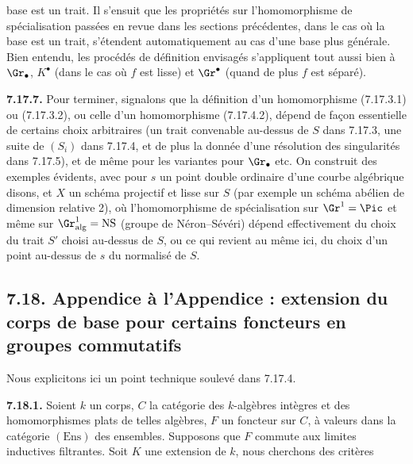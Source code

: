 base est un trait. Il s'ensuit que les propriétés sur l'homomorphisme de spécialisation passées en revue dans les sections précédentes, dans le cas où la base est un trait, s'étendent automatiquement au cas d'une base plus générale. Bien entendu, les procédés de définition envisagés s'appliquent tout aussi bien à \(\Gr_\bullet\), \(K^\bullet\) (dans le cas où \(f\) est lisse) et \(\Gr^\bullet\) (quand de plus \(f\) est séparé).

\textbf{7.17.7.} Pour terminer, signalons que la définition d'un homomorphisme (7.17.3.1) ou (7.17.3.2), ou celle d'un homomorphisme (7.17.4.2), dépend de façon essentielle de certains choix arbitraires (un trait convenable au-dessus de \(S\) dans 7.17.3, une suite de \((S_i)\) dans 7.17.4, et de plus la donnée d'une résolution des singularités dans 7.17.5), et de même pour les variantes pour \(\Gr_\bullet\) etc. On construit des exemples évidents, avec pour \(s\) un point double ordinaire d'une courbe algébrique disons, et \(X\) un schéma projectif et lisse sur \(S\) (par exemple un schéma abélien de dimension relative 2), où l'homomorphisme de spécialisation sur \(\Gr^1=\Pic\) et même sur \(\Gr^1_{\mathrm{alg}}=\mathrm{NS}\) (groupe de Néron--Sévéri) dépend effectivement du choix du trait \(S'\) choisi au-dessus de \(S\), ou ce qui revient au même ici, du choix d'un point au-dessus de \(s\) du normalisé de \(S\).

\subsection*{7.18. Appendice à l'Appendice : extension du corps de base pour certains foncteurs en groupes commutatifs}
Nous explicitons ici un point technique soulevé dans 7.17.4.

\textbf{7.18.1.} Soient \(k\) un corps, \(C\) la catégorie des \(k\)-algèbres intègres et des homomorphismes plats de telles algèbres, \(F\) un foncteur sur \(C\), à valeurs dans la catégorie \((\mathrm{Ens})\) des ensembles. Supposons que \(F\) commute aux limites inductives filtrantes. Soit \(K\) une extension de \(k\), nous cherchons des critères

